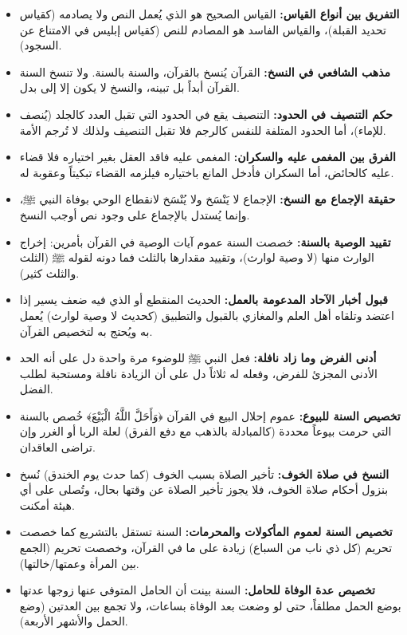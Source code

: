 \begin{itemize}
    \item \textbf{التفريق بين أنواع القياس:} القياس الصحيح هو الذي يُعمل النص ولا يصادمه (كقياس تحديد القبلة)، والقياس الفاسد هو المصادم للنص (كقياس إبليس في الامتناع عن السجود).
    \item \textbf{مذهب الشافعي في النسخ:} القرآن يُنسخ بالقرآن، والسنة بالسنة. ولا تنسخ السنة القرآن أبداً بل تبينه، والنسخ لا يكون إلا إلى بدل.
    \item \textbf{حكم التنصيف في الحدود:} التنصيف يقع في الحدود التي تقبل العدد كالجلد (يُنصف للإماء)، أما الحدود المتلفة للنفس كالرجم فلا تقبل التنصيف ولذلك لا تُرجم الأمة.
    \item \textbf{الفرق بين المغمى عليه والسكران:} المغمى عليه فاقد العقل بغير اختياره فلا قضاء عليه كالحائض، أما السكران فأدخل المانع باختياره فيلزمه القضاء تبكيتاً وعقوبة له.
    \item \textbf{حقيقة الإجماع مع النسخ:} الإجماع لا يَنْسَخ ولا يُنْسَخ لانقطاع الوحي بوفاة النبي ﷺ، وإنما يُستدل بالإجماع على وجود نص أوجب النسخ.
    \item \textbf{تقييد الوصية بالسنة:} خصصت السنة عموم آيات الوصية في القرآن بأمرين: إخراج الوارث منها (لا وصية لوارث)، وتقييد مقدارها بالثلث فما دونه لقوله ﷺ (الثلث والثلث كثير).
    \item \textbf{قبول أخبار الآحاد المدعومة بالعمل:} الحديث المنقطع أو الذي فيه ضعف يسير إذا اعتضد وتلقاه أهل العلم والمغازي بالقبول والتطبيق (كحديث لا وصية لوارث) يُعمل به ويُحتج به لتخصيص القرآن.
    \item \textbf{أدنى الفرض وما زاد نافلة:} فعل النبي ﷺ للوضوء مرة واحدة دل على أنه الحد الأدنى المجزئ للفرض، وفعله له ثلاثاً دل على أن الزيادة نافلة ومستحبة لطلب الفضل.
    \item \textbf{تخصيص السنة للبيوع:} عموم إحلال البيع في القرآن ﴿وَأَحَلَّ اللَّهُ الْبَيْعَ﴾ خُصص بالسنة التي حرمت بيوعاً محددة (كالمبادلة بالذهب مع دفع الفرق) لعلة الربا أو الغرر وإن تراضى العاقدان.
    \item \textbf{النسخ في صلاة الخوف:} تأخير الصلاة بسبب الخوف (كما حدث يوم الخندق) نُسخ بنزول أحكام صلاة الخوف، فلا يجوز تأخير الصلاة عن وقتها بحال، وتُصلى على أي هيئة أمكنت.
    \item \textbf{تخصيص السنة لعموم المأكولات والمحرمات:} السنة تستقل بالتشريع كما خصصت تحريم (كل ذي ناب من السباع) زيادة على ما في القرآن، وخصصت تحريم (الجمع بين المرأة وعمتها/خالتها).
    \item \textbf{تخصيص عدة الوفاة للحامل:} السنة بينت أن الحامل المتوفى عنها زوجها عدتها بوضع الحمل مطلقاً، حتى لو وضعت بعد الوفاة بساعات، ولا تجمع بين العدتين (وضع الحمل والأشهر الأربعة).

\end{itemize}

